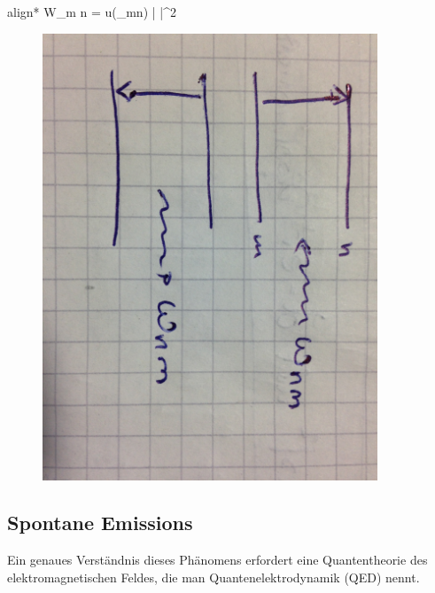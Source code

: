 	 	\begin{empheq}[box=\boxed]{align*}
		 	W_{m \leftarrow n} =  u(\omega_{mn})
		 	|  |^2
	 	\end{empheq}
	 	\begin{figure} [h]
	 		\begin{center}
	 			\includegraphics[width=10cm]{Bild1.jpg}
	 		\end{center}
		\end{figure}
	\FloatBarrier
\subsection{Spontane Emissions}
	Ein genaues Verständnis dieses Phänomens erfordert eine Quantentheorie des elektromagnetischen Feldes, die man Quantenelektrodynamik (QED) nennt. 
	\\
		
